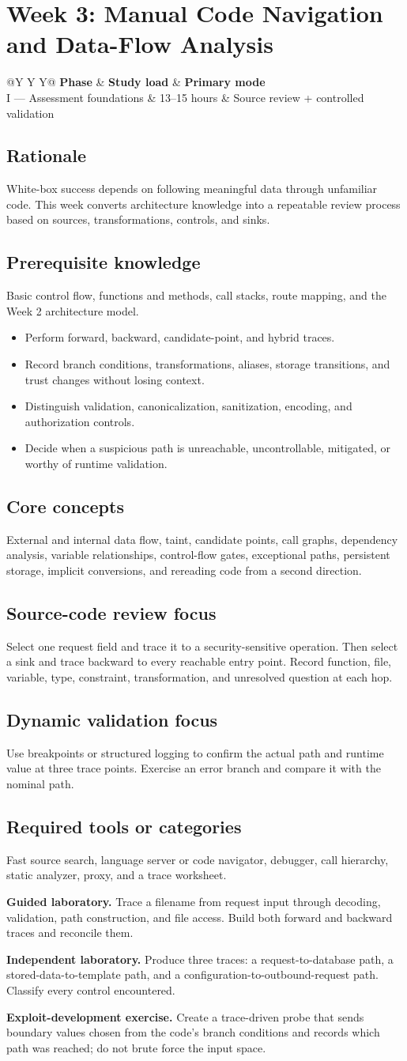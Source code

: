 \documentclass[11pt]{article}
\makeatletter
\newcommand{\weekheader}[4]{%
  \clearpage
  \section{Week #1: #2}
  \begin{tcolorbox}[colback=Navy,colframe=Navy,coltext=white]
    \begin{tabularx}{\linewidth}{@{}Y Y Y@{}}
      \textbf{Phase} & \textbf{Study load} & \textbf{Primary mode}\\
      #3 & #4 hours & Source review + controlled validation
    \end{tabularx}
  \end{tcolorbox}
}
\newcommand{\weekfield}[2]{%
  \Needspace{5\baselineskip}
  \subsection*{#1}
  #2
}
\makeatother
\begin{document}
\weekheader{3}{Manual Code Navigation and Data-Flow Analysis}{I --- Assessment foundations}{13--15}

\weekfield{Rationale}{White-box success depends on following meaningful data
through unfamiliar code. This week converts architecture knowledge into a
repeatable review process based on sources, transformations, controls, and sinks.}

\weekfield{Prerequisite knowledge}{Basic control flow, functions and methods,
call stacks, route mapping, and the Week 2 architecture model.}

\begin{objectivebox}
\begin{itemize}
  \item Perform forward, backward, candidate-point, and hybrid traces.
  \item Record branch conditions, transformations, aliases, storage transitions, and trust changes without losing context.
  \item Distinguish validation, canonicalization, sanitization, encoding, and authorization controls.
  \item Decide when a suspicious path is unreachable, uncontrollable, mitigated, or worthy of runtime validation.
\end{itemize}
\end{objectivebox}

\weekfield{Core concepts}{External and internal data flow, taint, candidate
points, call graphs, dependency analysis, variable relationships, control-flow
gates, exceptional paths, persistent storage, implicit conversions, and rereading
code from a second direction.}

\weekfield{Source-code review focus}{Select one request field and trace it to a
security-sensitive operation. Then select a sink and trace backward to every
reachable entry point. Record function, file, variable, type, constraint,
transformation, and unresolved question at each hop.}

\weekfield{Dynamic validation focus}{Use breakpoints or structured logging to
confirm the actual path and runtime value at three trace points. Exercise an error
branch and compare it with the nominal path.}

\weekfield{Required tools or categories}{Fast source search, language server or
code navigator, debugger, call hierarchy, static analyzer, proxy, and a trace
worksheet.}

\begin{labbox}
\textbf{Guided laboratory.} Trace a filename from request input through decoding,
validation, path construction, and file access. Build both forward and backward
traces and reconcile them.

\textbf{Independent laboratory.} Produce three traces: a request-to-database
path, a stored-data-to-template path, and a configuration-to-outbound-request
path. Classify every control encountered.

\textbf{Exploit-development exercise.} Create a trace-driven probe that sends
boundary values chosen from the code's branch conditions and records which path
was reached; do not brute force the input space.
\end{labbox}
\end{document}
